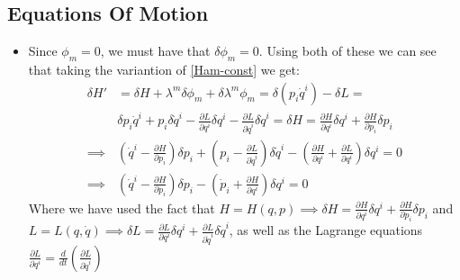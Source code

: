 \documentclass[11pt]{article}
\numberwithin{equation}{section}
\begin{document}
\subsection{Equations Of Motion} %
\label{sub:equations_of_motion}
\begin{itemize}
 \item Since $\phi_{m} = 0$, we must have that $\delta\phi_m = 0$. Using both of these we can see that taking the variantion of \ref{Ham-const} we get:
\begin{align}
\label{delta_H}
  \delta H' &= \delta H +\lambda^m\delta\phi_m+\delta\lambda^m\phi_m =  \delta(p_i \dot{q}^i)-\delta L = \nonumber \\ 
  & \delta p_i\dot{q}^i+p_i\delta \dot{q}^i - \frac{\partial L}{\partial q^i}\delta q^i-\frac{\partial L}{\partial \dot{q}^i}\delta \dot{q}^i  = \delta H = \frac{\partial H}{\partial q^i}\delta q^i+\frac{\partial H}{\partial p_i}\delta p_i  \nonumber \\
    \implies & \left(\dot{q}^i-\frac{\partial H}{\partial p_i}\right)\delta p_i+\left(p_i -\frac{\partial L}{\partial \dot{q}^i}\right)\delta\dot{q}^i -\left(\frac{\partial H}{\partial q^i}+\frac{\partial L}{\partial q^i}\right)\delta q^i = 0 \nonumber \\
   \implies & \left(\dot{q}^i-\frac{\partial H}{\partial p_i}\right)\delta p_i -\left(\dot{p}_i+\frac{\partial H}{\partial q^i}\right)\delta q^i = 0
\end{align}
Where we have used the fact that $H =H(q,p) \implies \delta H = \frac{\partial H}{\partial q^i}\delta q^i+\frac{\partial H}{\partial p_i}\delta p_i$ and $L =L(q,\dot{q}) \implies \delta L = \frac{\partial L}{\partial q^i}\delta q^i+\frac{\partial L}{\partial \dot{q}^i}\delta \dot{q}^i$, as well as the Lagrange equations $\frac{\partial L}{\partial q^i} = \frac{d}{dt}\left(\frac{\partial L}{\partial \dot{q}^i}\right)$


\end{itemize}
\end{document}

